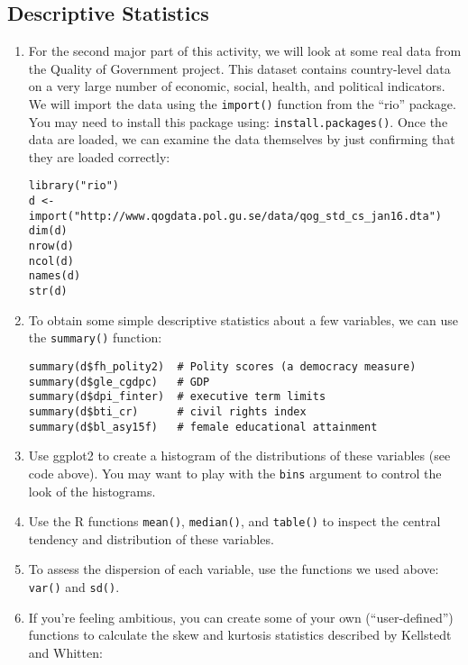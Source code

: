 \documentclass[a4paper,12pt]{article}
\begin{document}
\subsection{Descriptive Statistics}

\begin{enumerate}
\item For the second major part of this activity, we will look at some real data from the Quality of Government project. This dataset contains country-level data on a very large number of economic, social, health, and political indicators. We will import the data using the \texttt{import()} function from the ``rio'' package. You may need to install this package using: \texttt{install.packages()}. Once the data are loaded, we can examine the data themselves by just confirming that they are loaded correctly:

\begin{verbatim}
library("rio")
d <- import("http://www.qogdata.pol.gu.se/data/qog_std_cs_jan16.dta")
dim(d)
nrow(d)
ncol(d)
names(d)
str(d)
\end{verbatim}

\item To obtain some simple descriptive statistics about a few variables, we can use the \texttt{summary()} function:

\begin{verbatim}
summary(d$fh_polity2)  # Polity scores (a democracy measure)
summary(d$gle_cgdpc)   # GDP
summary(d$dpi_finter)  # executive term limits
summary(d$bti_cr)      # civil rights index
summary(d$bl_asy15f)   # female educational attainment
\end{verbatim}

\item Use ggplot2 to create a histogram of the distributions of these variables (see code above). You may want to play with the \texttt{bins} argument to control the look of the histograms.

\item Use the R functions \texttt{mean()}, \texttt{median()}, and \texttt{table()} to inspect the central tendency and distribution of these variables.

\item To assess the dispersion of each variable, use the functions we used above: \texttt{var()} and \texttt{sd()}.

\item If you're feeling ambitious, you can create some of your own (``user-defined'') functions to calculate the skew and kurtosis statistics described by Kellstedt and Whitten:


\end{enumerate}
\end{document}
